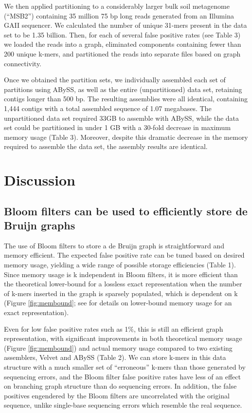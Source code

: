 \documentclass[draft]{pnastwo}
\begin{document}
\begin{article}
We then applied partitioning to a considerably larger bulk soil
metagenome (``MSB2'') containing 35 million 75 bp long reads generated
from an Illumina GAII sequencer.  We calculated the number of unique
31-mers present in the data set to be 1.35 billion. Then, for each of
several false positive rates (see Table 
3) we loaded
the reads into a graph, eliminated components containing fewer than
200 unique k-mers, and partitioned the reads into separate files based
on graph connectivity.

Once we obtained the partition sets, we individually assembled each
set of partitions using ABySS, as well as the entire (unpartitioned)
data set, retaining contigs longer than 500 bp.  The resulting
assemblies were all identical, containing 1,444 contigs with a total
assembled sequence of 1.07 megabases.  The unpartitioned data set
required 33GB to assemble with ABySS, while the data set could be
partitioned in under 1 GB with a 30-fold decrease in maximum memory usage
(Table 3).
Moreover, despite this dramatic decrease in the memory required to assemble
the data set, the assembly results are identical.


\section{Discussion}


\subsection{Bloom filters can be used to efficiently store de Bruijn graphs}

The use of Bloom filters to store a de Bruijn graph is straightforward
and memory efficient.  The expected false positive rate can be tuned
based on desired memory usage, yielding a wide range of possible
storage efficiencies (Table 1).
Since memory usage
is k independent in Bloom filters, it is more efficient than the
theoretical lower-bound for a lossless exact representation when the
number of k-mers inserted in the graph is sparsely populated, which is
dependent on k (Figure \ref{fig:membound}; see \cite{succinct} for
details on lower-bound memory usage for an exact representation).

Even for low false positive rates such as 1\%, this is still an
efficient graph representation, with significant improvements in both
theoretical memory usage (Figure \ref{fig:membound}) and actual memory 
usage compared
to two existing assemblers, Velvet and ABySS (Table
2). We can store k-mers in this data structure with a
much smaller set of ``erroneous'' k-mers than those generated by
sequencing errors, and the Bloom filter false positive rates have less
of an effect on branching graph structure than do sequencing errors.
In addition, the false positives engendered by the Bloom filters are
uncorrelated with the original sequence, unlike single-base sequencing
errors which resemble the real sequence.


\end{article}
\end{document}
